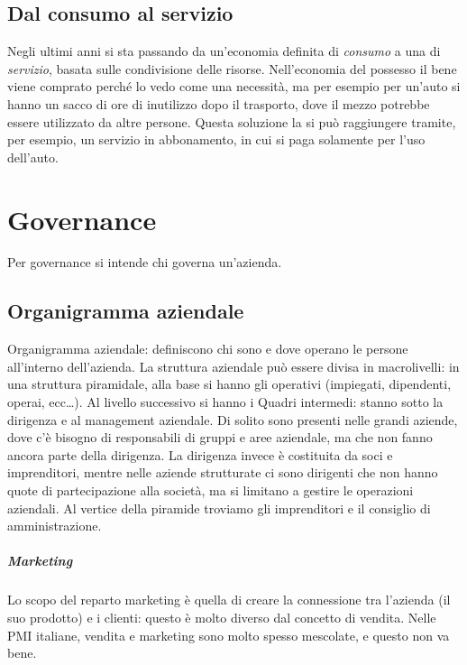 \section{Dal consumo al servizio} 

Negli ultimi anni si sta passando da un'economia definita di \textit{consumo} a
una di \textit{servizio}, basata sulle condivisione delle risorse.
Nell'economia del possesso il bene viene comprato perché lo vedo come una
necessità, ma per esempio per un'auto si hanno un sacco di ore di inutilizzo
dopo il trasporto, dove il mezzo potrebbe essere utilizzato da altre persone.
Questa soluzione la si può raggiungere tramite, per esempio, un servizio in
abbonamento, in cui si paga solamente per l'uso dell'auto.


\chapter{Governance}

Per governance si intende chi governa un'azienda.

\section{Organigramma aziendale}
Organigramma aziendale: definiscono chi sono e dove operano le persone
all'interno dell'azienda. La struttura aziendale può essere divisa in
macrolivelli: in una struttura piramidale, alla base si hanno gli operativi
(impiegati, dipendenti, operai, ecc\dots). Al livello successivo si hanno i
Quadri intermedi: stanno sotto la dirigenza e al management aziendale. Di solito
sono presenti nelle grandi aziende, dove c'è bisogno di responsabili di gruppi
e aree aziendale, ma che non fanno ancora parte della dirigenza. La dirigenza
invece è costituita da soci e imprenditori, mentre nelle aziende strutturate ci
sono dirigenti che non hanno quote di partecipazione alla società, ma si
limitano a gestire le operazioni aziendali. Al vertice della piramide troviamo
gli imprenditori e il consiglio di amministrazione.

\paragraph*{Marketing} Lo scopo del reparto marketing è quella di creare la
connessione tra l'azienda (il suo prodotto) e i clienti: questo è molto diverso
dal concetto di vendita. Nelle PMI italiane, vendita e marketing sono
molto spesso mescolate, e questo non va bene.

